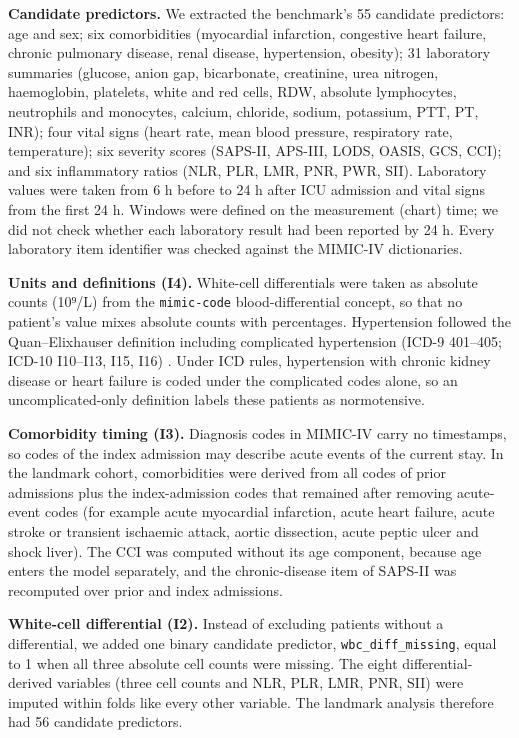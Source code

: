 \textbf{Candidate predictors.} We extracted the benchmark's 55 candidate
predictors: age and sex; six comorbidities (myocardial infarction, congestive
heart failure, chronic pulmonary disease, renal disease, hypertension, obesity);
31 laboratory summaries (glucose, anion gap, bicarbonate, creatinine, urea
nitrogen, haemoglobin, platelets, white and red cells, RDW, absolute
lymphocytes, neutrophils and monocytes, calcium, chloride, sodium, potassium,
PTT, PT, INR); four vital signs (heart rate, mean blood pressure, respiratory
rate, temperature); six severity scores (SAPS-II, APS-III, LODS, OASIS, GCS,
CCI); and six inflammatory ratios (NLR, PLR, LMR, PNR, PWR, SII). Laboratory
values were taken from 6 h before to 24 h after ICU admission and vital signs
from the first 24 h. Windows were defined on the measurement (chart) time; we
did not check whether each laboratory result had been reported by 24 h. Every
laboratory item identifier was checked against the MIMIC-IV dictionaries.

\textbf{Units and definitions (I4).} White-cell differentials were taken as
absolute counts (10⁹/L) from the \texttt{mimic-code} blood-differential concept,
so that no patient's value mixes absolute counts with percentages. Hypertension
followed the Quan--Elixhauser definition including complicated hypertension
(ICD-9 401--405; ICD-10 I10--I13, I15, I16) \parencite{quan2005}. Under ICD
rules, hypertension with chronic kidney disease or heart failure is coded under
the complicated codes alone, so an uncomplicated-only definition labels these
patients as normotensive.

\textbf{Comorbidity timing (I3).} Diagnosis codes in MIMIC-IV carry no
timestamps, so codes of the index admission may describe acute events of the
current stay. In the landmark cohort, comorbidities were derived from all codes
of prior admissions plus the index-admission codes that remained after removing
acute-event codes (for example acute myocardial infarction, acute heart failure,
acute stroke or transient ischaemic attack, aortic dissection, acute peptic
ulcer and shock liver). The CCI was computed without its age component, because
age enters the model separately, and the chronic-disease item of SAPS-II was
recomputed over prior and index admissions.

\textbf{White-cell differential (I2).} Instead of excluding patients without a
differential, we added one binary candidate predictor,
\texttt{wbc\_diff\_missing}, equal to 1 when all three absolute cell counts were
missing. The eight differential-derived variables (three cell counts and NLR,
PLR, LMR, PNR, SII) were imputed within folds like every other variable. The
landmark analysis therefore had 56 candidate predictors.

